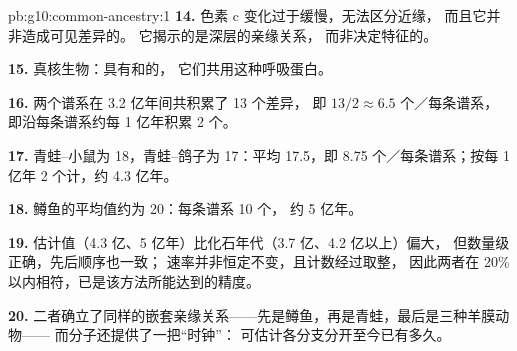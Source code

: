 \begin{solution}{pb:g10:common-ancestry:1}
\textbf{14.} 色素 c 变化过于缓慢，无法区分近缘，
而且它并非造成可见差异的。
它揭示的是深层的亲缘关系，
而非决定特征的。

\textbf{15.} 真核生物：具有和的，
它们共用这种呼吸蛋白。

\textbf{16.} 两个谱系在 3.2 亿年间共积累了 13 个差异，
即 $13/2 \approx 6.5$ 个／每条谱系，
即沿每条谱系约每 1 亿年积累 2 个。

\textbf{17.} 青蛙–小鼠为 18，青蛙–鸽子为 17：平均 17.5，即 8.75
个／每条谱系；按每 1 亿年 2 个计，约 4.3 亿年。

\textbf{18.} 鳟鱼的平均值约为 20：每条谱系 10 个，
约 5 亿年。

\textbf{19.} 估计值（4.3 亿、5 亿年）比化石年代（3.7 亿、4.2 亿以上）偏大，
但数量级正确，先后顺序也一致；
速率并非恒定不变，且计数经过取整，
因此两者在 20\% 以内相符，已是该方法所能达到的精度。

\textbf{20.} 二者确立了同样的嵌套亲缘关系——先是鳟鱼，再是青蛙，最后是三种羊膜动物——
而分子还提供了一把“时钟”：
可估计各分支分开至今已有多久。
\end{solution}
